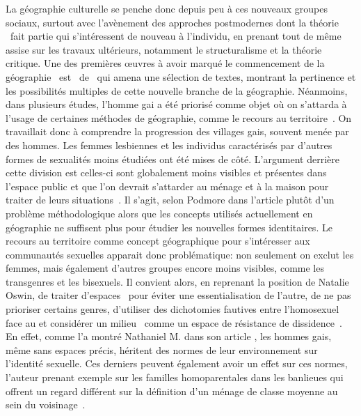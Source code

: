 La géographie culturelle se penche donc depuis peu à ces nouveaux groupes sociaux, surtout avec l'avènement des approches postmodernes dont la théorie \qu\ fait partie qui s'intéressent de nouveau à l'individu, en prenant tout de même assise sur les travaux ultérieurs, notamment le structuralisme et la théorie critique. 
Une des premières œuvres à avoir marqué le commencement de la géographie \qu\ est~ de~\citet{Bell1994} qui amena une sélection de textes, montrant la pertinence et les possibilités multiples de cette nouvelle branche de la géographie. 
Néanmoins, dans plusieurs études, l'homme gai a été priorisé comme objet où on s'attarda à l'usage de certaines méthodes de géographie, comme le recours au territoire~\citep{Podmore2001,Oswin2008}. 
On travaillait donc à comprendre la progression des villages gais, souvent menée par des hommes.
Les femmes lesbiennes et les individus caractérisés par d'autres formes de sexualités moins étudiées ont été mises de côté.
L'argument derrière cette division est celles-ci sont globalement moins visibles et présentes dans l'espace public et que l'on devrait s'attarder au ménage et à la maison pour traiter de leurs situations~\citep[333-334]{Podmore2001}. 
Il s'agit, selon Podmore dans l'article  plutôt d'un problème méthodologique alors que les concepts utilisés actuellement en géographie ne suffisent plus pour étudier les nouvelles formes identitaires. 
Le recours au territoire comme concept géographique pour s'intéresser aux communautés sexuelles apparait donc problématique: non seulement on exclut les femmes, mais également d'autres groupes encore moins visibles, comme les transgenres et les bisexuels. 
Il convient alors, en reprenant la position de Natalie Oswin, de traiter d'espaces \qus\ pour éviter une essentialisation de l'autre, de ne pas prioriser certains genres, d'utiliser des dichotomies fautives entre l'homosexuel face au  et considérer  un milieu \qu\ comme un espace de résistance de dissidence~\citep{Oswin2008}. 
En effet, comme l'a montré Nathaniel M. \citet{Lewis2011} dans son article , les hommes gais, même sans espaces précis, héritent des normes de leur environnement sur l'identité sexuelle. 
Ces derniers peuvent également avoir un effet sur ces normes, l'auteur prenant exemple sur les familles homoparentales dans les banlieues qui offrent un regard différent sur la définition d'un ménage de classe moyenne au sein du voisinage~\citep[304]{Lewis2011}.

